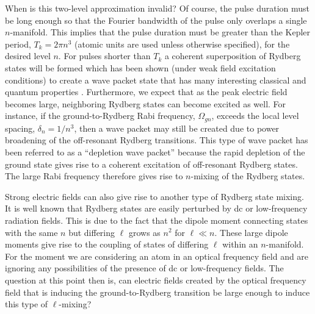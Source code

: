 When is this two-level approximation invalid?  Of course, the pulse duration
must be long enough so that the Fourier bandwidth of the pulse only overlaps
a single $n$-manifold.  This implies that the pulse duration must be greater
than the Kepler period, $T_k = 2 \pi n^3$ (atomic units are used unless
otherwise specified), for the desired
level $n$.  For pulses shorter than $T_k$ a coherent superposition of
Rydberg states will be formed which has been shown (under weak field
excitation conditions) to create a wave packet state that has many
interesting classical and quantum properties
\cite{Parker:86,tenWolde:88,Yeazell:89}.  Furthermore, we expect that as the
peak electric field becomes large, neighboring Rydberg states can become
excited as well.  For instance, if the ground-to-Rydberg Rabi frequency,
$\Omega_{gn}$, exceeds the local level spacing, $\delta_n = 1/n^3$, then a
wave packet may still be created due to power broadening of the off-resonant
Rydberg transitions.  This type of wave packet has been referred to as a
``depletion wave packet'' \cite{Alber:91} because the rapid depletion of the
ground state gives rise to a coherent excitation of off-resonant Rydberg
states.  The large Rabi frequency therefore gives rise to $n$-mixing of the
Rydberg states.

Strong electric fields can also give rise to another type of Rydberg state
mixing.  It is well known that Rydberg states are easily perturbed by dc or
low-frequency radiation fields.  This is due to the fact that the dipole moment
connecting states with the same $n$ but differing $\ell$ grows as $n^2$ for
$\ell \ll n$.  These large dipole moments give rise to the coupling of states
of differing $\ell$ within an $n$-manifold.  For the moment we are considering
an atom in an optical frequency field and are ignoring any possibilities of the
presence of dc or low-frequency fields.  The question at this point then is, can
electric fields created by the optical frequency field that is inducing the
ground-to-Rydberg transition be large enough to induce this type of
$\ell$-mixing?

